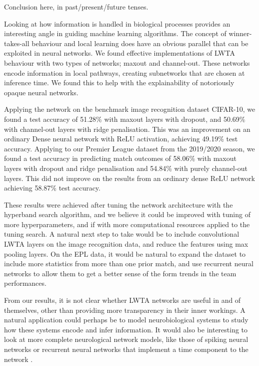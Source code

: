 Conclusion here, in past/present/future tenses.

Looking at how information is handled in biological processes provides an interesting angle in guiding machine learning algorithms. The concept of winner-takes-all behaviour and local learning does have an obvious parallel that can be exploited in neural networks. We found effective implementations of LWTA behaviour with two types of networks; maxout and channel-out. These networks encode information in local pathways, creating subnetworks that are chosen at inference time. We found this to help with the explainability of notoriously opaque neural networks.

Applying the network on the benchmark image recognition dataset CIFAR-10, we found a test accuracy of 51.28\% with maxout layers with dropout, and 50.69\% with channel-out layers with ridge penalisation. This was an improvement on an ordinary Dense neural network with ReLU activation, achieving 49.19\% test accuracy. Applying to our Premier League dataset from the 2019/2020 season, we found a test accuracy in predicting match outcomes of 58.06\% with maxout layers with dropout and ridge penalisation and 54.84\% with purely channel-out layers. This did not improve on the results from an ordinary dense ReLU network achieving 58.87\% test accuracy.

These results were achieved after tuning the network architecture with the hyperband search algorithm, and we believe it could be improved with tuning of more hyperparameters, and if with more computational resources applied to the tuning search. A natural next step to take would be to include convolutional LWTA layers on the image recognition data, and reduce the features using max pooling layers. On the EPL data, it would be natural to expand the dataset to include more statistics from more than one prior match, and use recurrent neural networks to allow them to get a better sense of the form trends in the team performances.

From our results, it is not clear whether LWTA networks are useful in and of themselves, other than providing more transparency in their inner workings. A natural application could perhaps be to model neurobiological systems to study how these systems encode and infer information. It would also be interesting to look at more complete neurological network models, like those of spiking neural networks or recurrent neural networks that implement a time component to the network \citep{Chen}. 




